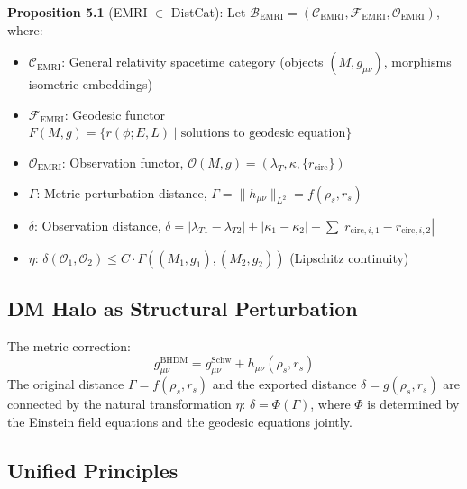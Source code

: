 \documentclass[12pt]{article}
\begin{document}
\textbf{Proposition 5.1} (EMRI $\in$ DistCat): Let $\mathcal{B}_{\text{EMRI}} = (\mathcal{C}_{\text{EMRI}}, \mathcal{F}_{\text{EMRI}}, \mathcal{O}_{\text{EMRI}})$, where:
\begin{itemize}
\item $\mathcal{C}_{\text{EMRI}}$: General relativity spacetime category (objects $(M, g_{\mu\nu})$, morphisms isometric embeddings)
\item $\mathcal{F}_{\text{EMRI}}$: Geodesic functor $F(M, g) = \{r(\phi; E, L) \mid \text{solutions to geodesic equation}\}$
\item $\mathcal{O}_{\text{EMRI}}$: Observation functor, $\mathcal{O}(M, g) = (\lambda_T, \kappa, \{r_{\text{circ}}\})$
\item $\Gamma$: Metric perturbation distance, $\Gamma = \|h_{\mu\nu}\|_{L^2} = f(\rho_s, r_s)$
\item $\delta$: Observation distance, $\delta = |\lambda_{T1} - \lambda_{T2}| + |\kappa_1 - \kappa_2| + \sum|r_{\text{circ},i,1} - r_{\text{circ},i,2}|$
\item $\eta$: $\delta(\mathcal{O}_1, \mathcal{O}_2) \leq C \cdot \Gamma((M_1, g_1), (M_2, g_2))$ (Lipschitz continuity)
\end{itemize}

\subsection{DM Halo as Structural Perturbation}

The metric correction:
\begin{equation}
g_{\mu\nu}^{\text{BHDM}} = g_{\mu\nu}^{\text{Schw}} + h_{\mu\nu}(\rho_s, r_s)
\end{equation}
The original distance $\Gamma = f(\rho_s, r_s)$ and the exported distance $\delta = g(\rho_s, r_s)$ are connected by the natural transformation $\eta$: $\delta = \Phi(\Gamma)$, where $\Phi$ is determined by the Einstein field equations and the geodesic equations jointly.

\subsection{Unified Principles}
\end{document}
